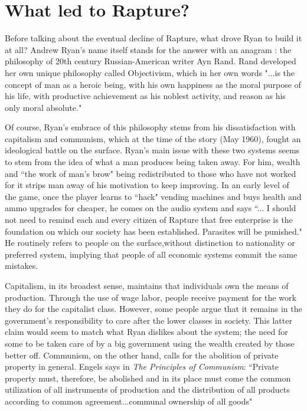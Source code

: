 \documentclass{article}
\begin{document}
\section{What led to Rapture?}
Before talking about the eventual decline of Rapture, what drove Ryan to build it at all? Andrew Ryan's name
itself stands for the answer with an anagram : the philosophy of 
20th century Russian-American writer Ayn Rand. Rand 
developed her own unique philosophy called Objectivism, which in her own words "...is the concept of man
as a heroic being, with his own happiness as the moral purpose of his life, with productive achievement as
his noblest activity, and reason as his only moral absolute."\textcite{AtlasShrugged}

Of course, Ryan's embrace of this philosophy stems from his dissatisfaction with capitalism and communism,
which at the time of the story (May 1960), fought an ideological battle on the surface. Ryan's 
main issue with these two systems seems to stem from the idea of what a man produces being taken away. For 
him, wealth and ``the work of man's brow" being redistributed to those who have not worked for it strips man
away of his motivation to keep improving. In an early level of the game, once the player learns to ``hack"
vending machines and buys health and ammo upgrades for cheaper, he comes on the audio system and says ``...
I should not need to remind each and every citizen of Rapture that free enterprise is the foundation on which
our society has been established. Parasites will be punished."\textcite{Bioshock} He routinely refers to 
people on the surface,without distinction to nationality or preferred system, implying that people 
of all economic systems commit the same mistakes.

Capitalism, in its broadest sense, maintains that individuals own the means of production. Through the use of
wage labor, people receive payment for the work they do for the capitalist class. \textcite{ComparingEconomics}
However, some people argue that it remains in the government's responsibility to care after the lower classes in
society.  This latter claim would seem to match what Ryan dislikes about the system; the need for some to be 
taken care of by a big government using the wealth created by those better off. Communism, on the other hand,
calls for the abolition of private property in general. Engels says in \textit{The Principles of Communism}:
``Private property must, therefore, be abolished and in its place must come the common utilization of all 
instruments of production and the distribution of all products according to common agreement...communal
ownership of all goods"\textcite{PrinciplesOfCommunism}
\end{document}
